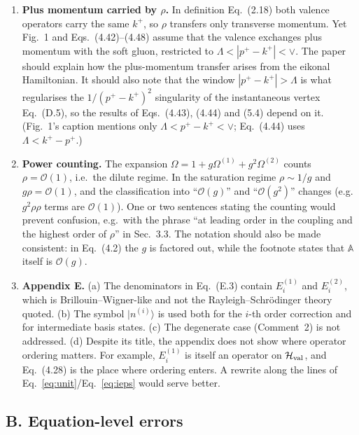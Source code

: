 \documentclass[11pt,a4paper]{article}
\newcommand{\eq}[1]{Eq.~(#1)}
\newcommand{\eqs}[1]{Eqs.~(#1)}
\begin{document}
\begin{enumerate}[label=\textbf{A\arabic*.},leftmargin=26pt,itemsep=6pt]
\item \textbf{Plus momentum carried by $\rho$.} In definition \eq{2.18} both valence operators carry the same $k^+$, so $\rho$ transfers only transverse momentum. Yet Fig.~1 and \eqs{4.42}--(4.48) assume that the valence exchanges plus momentum with the soft gluon, restricted to $\Lambda<|p^+-k^+|<\vee$. The paper should explain how the plus-momentum transfer arises from the eikonal Hamiltonian. It should also note that the window $|p^+-k^+|>\Lambda$ is what regularises the $1/(p^+-k^+)^2$ singularity of the instantaneous vertex \eq{D.5}, so the results of \eqs{4.43}, (4.44) and (5.4) depend on it. (Fig.~1's caption mentions only $\Lambda<p^+-k^+<\vee$; \eq{4.44} uses $\Lambda<k^+-p^+$.)

\item \textbf{Power counting.} The expansion $\Omega=1+g\Omega^{(1)}+g^2\Omega^{(2)}$ counts $\rho=\mathcal O(1)$, i.e.\ the dilute regime. In the saturation regime $\rho\sim1/g$ and $g\rho=\mathcal O(1)$, and the classification into ``$\mathcal O(g)$'' and ``$\mathcal O(g^2)$'' changes (e.g.\ $g^2\rho\rho$ terms are $\mathcal O(1)$). One or two sentences stating the counting would prevent confusion, e.g.\ with the phrase ``at leading order in the coupling and the highest order of $\rho$'' in Sec.~3.3. The notation should also be made consistent: in \eq{4.2} the $g$ is factored out, while the footnote states that $\mathbb A$ itself is $\mathcal O(g)$.

\item \textbf{Appendix E.} (a) The denominators in \eq{E.3} contain $E^{(1)}_i$ and $E^{(2)}_i$, which is Brillouin--Wigner-like and not the Rayleigh--Schr\"odinger theory quoted. (b) The symbol $|n^{(i)}\rangle$ is used both for the $i$-th order correction and for intermediate basis states. (c) The degenerate case (Comment~2) is not addressed. (d) Despite its title, the appendix does not show where operator ordering matters. For example, $E^{(1)}_i$ is itself an operator on $\mathcal H_{\rm val}$, and \eq{4.28} is the place where ordering enters. A rewrite along the lines of Eq.~\eqref{eq:unit}/Eq.~\eqref{eq:ieps} would serve better.
\end{enumerate}

\subsection*{B. Equation-level errors}
\end{document}
